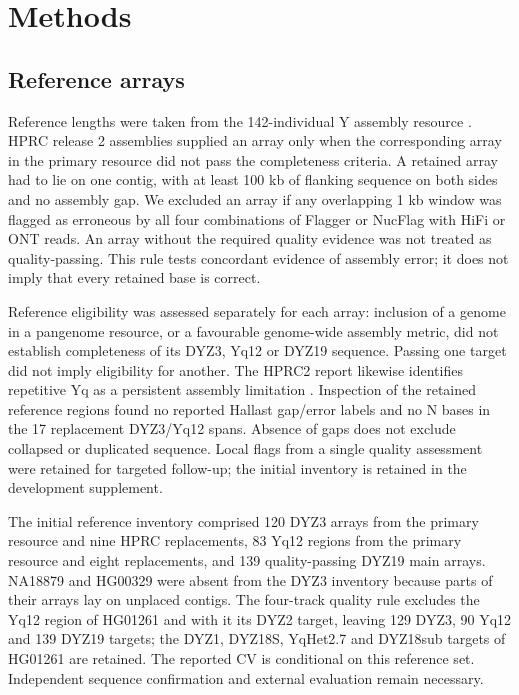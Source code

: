 \documentclass[pdflatex,sn-nature]{sn-jnl}
\begin{document}
\section{Methods}\label{sec:methods}

\subsection{Reference arrays}\label{sec:m-truth}
Reference lengths were taken from the 142-individual Y assembly resource \cite{Hallast2026}. HPRC release 2 assemblies \cite{HPRCRelease2} supplied an array only when the corresponding array in the primary resource did not pass the completeness criteria. A retained array had to lie on one contig, with at least 100 kb of flanking sequence on both sides and no assembly gap. We excluded an array if any overlapping 1 kb window was flagged as erroneous by all four combinations of Flagger or NucFlag with HiFi or ONT reads. An array without the required quality evidence was not treated as quality-passing. This rule tests concordant evidence of assembly error; it does not imply that every retained base is correct.

Reference eligibility was assessed separately for each array: inclusion of a genome in a pangenome resource, or a favourable genome-wide assembly metric, did not establish completeness of its DYZ3, Yq12 or DYZ19 sequence. Passing one target did not imply eligibility for another. The HPRC2 report likewise identifies repetitive Yq as a persistent assembly limitation \cite{Lucas2026}. Inspection of the retained reference regions found no reported Hallast gap/error labels and no N bases in the 17 replacement DYZ3/Yq12 spans. Absence of gaps does not exclude collapsed or duplicated sequence. Local flags from a single quality assessment were retained for targeted follow-up; the initial inventory is retained in the development supplement.

The initial reference inventory comprised 120 DYZ3 arrays from the primary resource and nine HPRC replacements, 83 Yq12 regions from the primary resource and eight replacements, and 139 quality-passing DYZ19 main arrays. NA18879 and HG00329 were absent from the DYZ3 inventory because parts of their arrays lay on unplaced contigs. The four-track quality rule excludes the Yq12 region of HG01261 and with it its DYZ2 target, leaving 129 DYZ3, 90 Yq12 and 139 DYZ19 targets; the DYZ1, DYZ18S, YqHet2.7 and DYZ18sub targets of HG01261 are retained. The reported CV is conditional on this reference set. Independent sequence confirmation and external evaluation remain necessary.
\end{document}
